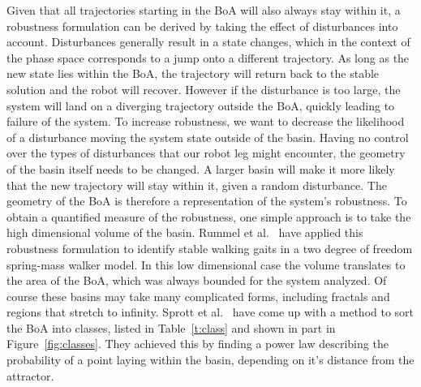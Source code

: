 Given that all trajectories starting in the BoA will also always stay within it, a robustness formulation can be derived by taking the effect of disturbances into account. Disturbances generally result in a state changes, which in the context of the phase space corresponds to a jump onto a different trajectory. As long as the new state lies within the BoA, the trajectory will return back to the stable solution and the robot will recover. However if the disturbance is too large, the system will land on a diverging trajectory outside the BoA, quickly leading to failure of the system. To increase robustness, we want to decrease the likelihood of a disturbance moving the system state outside of the basin. Having no control over the types of disturbances that our robot leg might encounter, the geometry of the basin itself needs to be changed. A larger basin will make it more likely that the new trajectory will stay within it, given a random disturbance. The geometry of the BoA is therefore a representation of the system's robustness. To obtain a quantified measure of the robustness, one simple approach is to take the high dimensional volume of the basin.
Rummel et al.\ \cite{walkbasin} have applied this robustness formulation to identify stable walking gaits in a two degree of freedom spring-mass walker model. In this low dimensional case the volume translates to the area of the BoA, which was always bounded for the system analyzed. Of course these basins may take many complicated forms, including fractals and regions that stretch to infinity. Sprott et al.\ \cite{classify} have come up with a method to sort the BoA into classes, listed in Table~\ref{t:class} and shown in part in Figure~\ref{fig:classes}. They achieved this by finding a power law describing the probability of a point laying within the basin, depending on it's distance from the attractor. 

